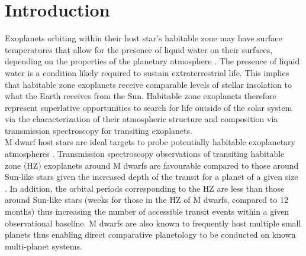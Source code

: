 \section{Introduction}
Exoplanets orbiting within their host star's habitable zone may have surface temperatures that allow
for the presence of liquid water on their surfaces, depending on the properties of the planetary
atmosphere \citep{kasting93}. The presence of liquid water is a condition likely required to sustain extraterrestrial life.
This implies that habitable zone exoplanets receive comparable levels of stellar insolation to what the Earth
receives from the Sun. Habitable zone exoplanets therefore represent superlative opportunities to
search for life outside of the solar system via the characterization of their atmospheric structure
and composition via transmission spectroscopy for transiting exoplanets. \\

M dwarf host stars are ideal targets to probe potentially habitable exoplanetary atmospheres
\citep[e.g.][]{kaltenegger11, rodler14}. 
Transmission spectroscopy observations of transiting habitable zone (HZ) exoplanets around
M dwarfs are favourable compared
to those around Sun-like stars given the increased depth of the transit for a planet of a given size 
\citep[e.g.][]{stevenson10, kreidberg14a}. In addition, the orbital periods corresponding to
the HZ are less than those around Sun-like stars (weeks for those in the HZ of M dwarfs, compared to 12 months)
thus increasing the number of accessible transit events within a given observational baseline.
M dwarfs are also known to frequently host multiple small planets
\citep[typically 2.5 planets per star with $0.5 \leq r_p/\text{R}_{\oplus} \leq 4$ and within 200 days;][]{dressing15a,gaidos16}
thus enabling direct comparative planetology to be conducted on known multi-planet systems. \\

